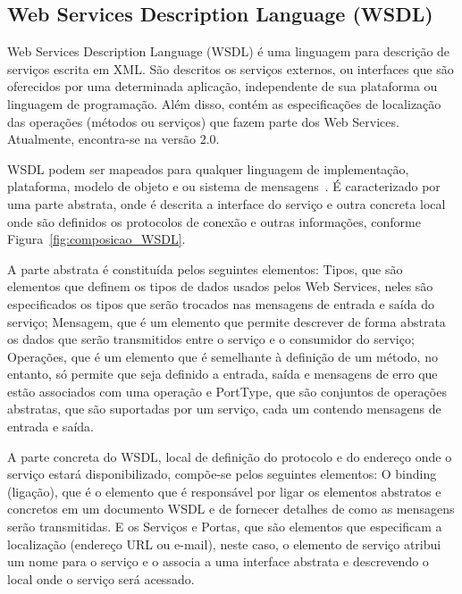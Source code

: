 \subsection{Web Services Description Language (WSDL)}

Web Services Description Language (WSDL) é uma linguagem para descrição de serviços escrita em XML. São descritos os serviços externos, ou interfaces que são oferecidos por uma determinada aplicação, independente de sua plataforma ou linguagem de programação. Além disso, contém as especificações de localização das operações (métodos ou serviços) que fazem parte dos Web Services. Atualmente, encontra-se na versão 2.0.

WSDL podem ser mapeados para qualquer linguagem de implementação, plataforma, modelo de objeto e ou sistema de mensagens~\cite{Bertino2010}. É caracterizado por uma parte abstrata, onde é descrita a interface do serviço e outra concreta local onde são definidos os protocolos de conexão e outras informações, conforme Figura~\ref{fig:composicao_WSDL}.

A parte abstrata é constituída pelos seguintes elementos: Tipos, que são elementos que definem os tipos de dados usados pelos Web Services, neles são especificados os tipos que serão trocados nas mensagens de entrada e saída do serviço; Mensagem, que é um elemento que permite descrever de forma abstrata os dados que serão transmitidos entre o serviço e o consumidor do serviço; Operações, que é um elemento que é semelhante à definição de um método, no entanto, só permite que seja definido a entrada, saída e mensagens de erro que estão associados com uma operação e PortType, que são conjuntos de operações abstratas, que são suportadas por um serviço, cada um contendo mensagens de entrada e saída.

A parte concreta do WSDL, local de definição do protocolo e do endereço onde o serviço estará disponibilizado, compõe-se pelos seguintes elementos: O binding (ligação), que é o elemento que é responsável por ligar os elementos abstratos e concretos em um documento WSDL e de fornecer detalhes de como as mensagens serão transmitidas. E os Serviços e Portas, que são elementos que especificam a localização (endereço URL ou e-mail), neste caso, o elemento de serviço atribui um nome para o serviço e o associa a uma interface abstrata e descrevendo o local onde o serviço será acessado.

